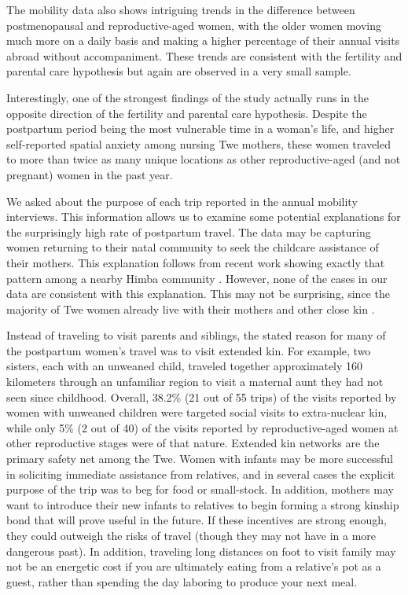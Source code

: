 The mobility data also shows intriguing trends in the difference between postmenopausal and reproductive-aged women, with the older women moving much more on a daily basis and making a higher percentage of their annual visits abroad without accompaniment.  These trends are consistent with the fertility and parental care hypothesis but again are observed in a very small sample.

Interestingly, one of the strongest findings of the study actually runs in the opposite direction of the fertility and parental care hypothesis.  Despite the postpartum period being the most vulnerable time in a woman's life, and higher self-reported spatial anxiety among nursing Twe mothers, these women traveled to more than twice as many unique locations as other reproductive-aged (and not pregnant) women in the past year. 

We asked about the purpose of each trip reported in the annual mobility interviews.  This information allows us to examine some potential explanations for the surprisingly high rate of postpartum travel.  The data may be capturing women returning to their natal community to seek the childcare assistance of their mothers.  This explanation follows from recent work showing exactly that pattern among a nearby Himba community  \citep{scelza2011female}.  However, none of the cases in our data are consistent with this explanation.  This may not be surprising, since the majority of Twe women already live with their mothers and other close kin \citep{vashro2014residence}.  

Instead of traveling to visit parents and siblings, the stated reason for many of the postpartum women's travel was to visit extended kin.  For example, two sisters, each with an unweaned child, traveled together approximately 160 kilometers through an unfamiliar region to visit a maternal aunt they had not seen since childhood.  Overall, 38.2\% (21 out of 55 trips) of the visits reported by women with unweaned children were targeted social visits to extra-nuclear kin, while only 5\% (2 out of 40) of the visits reported by reproductive-aged women at other reproductive stages were of that nature.  Extended kin networks are the primary safety net among the Twe.  Women with infants may be more successful in soliciting immediate assistance from relatives, and in several cases the explicit purpose of the trip was to beg for food or small-stock.  In addition, mothers may want to introduce their new infants to relatives to begin forming a strong kinship bond that will prove useful in the future.  If these incentives are strong enough, they could outweigh the risks of travel (though they may not have in a more dangerous past).  In addition, traveling long distances on foot to visit family may not be an energetic cost if you are ultimately eating from a relative's pot as a guest, rather than spending the day laboring to produce your next meal.

